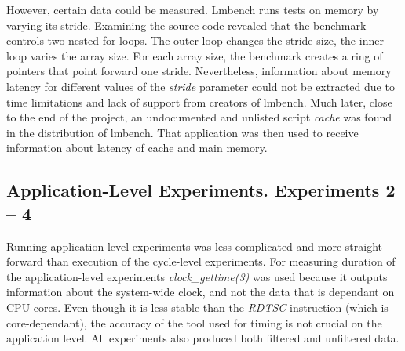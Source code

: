 However, certain data could be measured. Lmbench runs tests on memory by varying its stride. Examining the source code revealed that the benchmark controls two nested for-loops. The outer loop changes the stride size, the inner loop varies the array size. For each array size, the benchmark creates a ring of pointers that point forward one stride. Nevertheless, information about memory latency for different values of the \textit{stride} parameter could not be extracted due to time limitations and lack of support from creators of lmbench. Much later, close to the end of the project, an undocumented and unlisted script \textit{cache} was found in the distribution of lmbench. That application was then used to receive information about latency of cache and main memory.
   
\subsection{Application-Level Experiments. Experiments 2 -- 4}

Running application-level experiments was less complicated and more straight-forward than execution of the cycle-level experiments. For measuring duration of the application-level experiments \textit{clock\_gettime(3)} was used because it outputs information about the system-wide clock, and not the data that is dependant on CPU cores. Even though it is less stable than the \textit{RDTSC} instruction (which is core-dependant), the accuracy of the tool used for timing is not crucial on the application level. All experiments also produced both filtered and unfiltered data.


